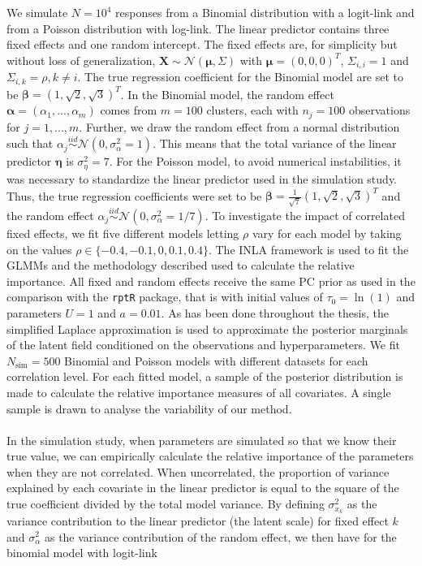We simulate $N=10^4$ responses from a Binomial distribution with a logit-link and from a Poisson distribution with log-link. The linear predictor contains three fixed effects and one random intercept. The fixed effects are, for simplicity but without loss of generalization, $\mathbf{X} \sim \mathcal{N}(\boldsymbol{\mu}, \Sigma)$ with $\boldsymbol{\mu} = (0, 0, 0)^T$, $\Sigma_{i, i} = 1$ and $\Sigma_{i, k} = \rho, k \neq i$. The true regression coefficient for the Binomial model are set to be $\boldsymbol{\beta}=(1, \sqrt{2}, \sqrt{3})^T$. In the Binomial model, the random effect $\boldsymbol{\alpha}=(\alpha_1, ..., \alpha_m)$ comes from $m=100$ clusters, each with $n_j=100$ observations for $j=1, ..., m$. Further, we draw the random effect from a normal distribution such that $\alpha_j \stackrel{iid}{\sim} \mathcal{N}(0, \sigma^2_{\alpha}=1)$. This means that the total variance of the linear predictor $\boldsymbol{\eta}$ is $\sigma_{\eta}^2=7$. For the Poisson model, to avoid numerical instabilities, it was necessary to standardize the linear predictor used in the simulation study. Thus, the true regression coefficients were set to be $\boldsymbol{\beta}=\frac{1}{\sqrt{7}}(1, \sqrt{2}, \sqrt{3})^T$ and the random effect $\alpha_j \stackrel{iid}{\sim} \mathcal{N}(0, \sigma^2_{\alpha}=1/7)$. To investigate the impact of correlated fixed effects, we fit five different models letting $\rho$ vary for each model by taking on the values $\rho \in \{-0.4, -0.1, 0, 0.1, 0.4\}$. The INLA framework is used to fit the GLMMs and the methodology described used to calculate the relative importance. All fixed and random effects receive the same PC prior as used in the comparison with the \texttt{rptR} package, that is with initial values of $\tau_0=\ln(1)$ and parameters $U=1$ and $a=0.01$. As has been done throughout the thesis, the simplified Laplace approximation is used to approximate the posterior marginals of the latent field conditioned on the observations and hyperparameters. We fit $N_{\text{sim}}=500$ Binomial and Poisson models with different datasets for each correlation level. For each fitted model, a sample of the posterior distribution is made to calculate the relative importance measures of all covariates. A single sample is drawn to analyse the variability of our method. 
\\
\\
In the simulation study, when parameters are simulated so that we know their true value, we can empirically calculate the relative importance of the parameters when they are not correlated. When uncorrelated, the proportion of variance explained by each covariate in the linear predictor is equal to the square of the true coefficient divided by the total model variance. By defining $\sigma_{x_k}^2$ as the variance contribution to the linear predictor (the latent scale) for fixed effect $k$ and $\sigma^2_{\alpha}$ as the variance contribution of the random effect, we then have for the binomial model with logit-link

